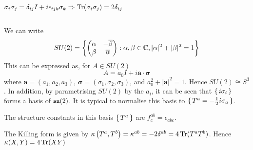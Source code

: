 \documentclass{article}
\begin{document}
\begin{fact}$\sigma_i \sigma_j = \delta_{ij}I +i\epsilon_{ijk}\sigma_k \Rightarrow \operatorname{Tr}(\sigma_i \sigma_j) = 2\delta_{ij}$
\end{fact}
\subsection{}
We can write 
\[
SU(2)=\left\{     \begin{pmatrix} \alpha & -\overline{\beta} \\ \beta & \overline{\alpha} \end{pmatrix}  : \alpha,\beta\in\mathbb{C} , |\alpha|^2+|\beta|^2=1    \right\}
\]
This can be expressed as, for $A\in SU(2)$
\[
A=a_0 I +i\bm{a}\cdot\bm{\sigma}
\]
where $\bm{a}=(a_1, a_2, a_3)$, $\bm{\sigma}=(\sigma_1, \sigma_2, \sigma_3)$, and $a_0^2+|\bm{a}|^2=1$. Hence $SU(2)\cong S^3$. In addition, by parametrising $SU(2)$ by the $a_i$, it can be seen that $\set{  i\sigma_i }$ forms a basis of $\mathfrak{su}(2)$. It is typical to normalise this basis to $\set{  T^a=-\frac{1}{2} i\sigma_a  }$. 

\begin{lemma}
	The structure constants in this basis $\set{  T^a  }$ are $f^{ab}_c=\epsilon_{abc}$.
\end{lemma}

\begin{corollary}
	The Killing form is given by $\kappa\left( T^a,T^b \right) = \kappa^{ab} = -2\delta^{ab} = 4\operatorname{Tr}(T^aT^b)$. Hence $\kappa(X,Y) = 4\operatorname{Tr}(XY)$
\end{corollary}

\end{document}
